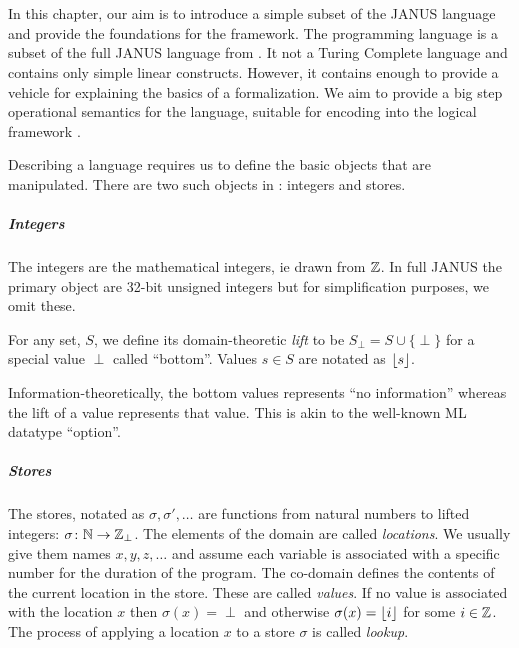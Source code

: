\chapter{\janusz{}}
\label{chap:janus0}

In this chapter, our aim is to introduce a simple subset of the JANUS
language and provide the foundations for the \coq{} framework. The
\janusz{} programming language is a subset of the full JANUS language
from \cite{yokoyama.gluck:reversible}. It not a Turing Complete language and
contains only simple linear constructs. However, it contains enough to
provide a vehicle for explaining the basics of a formalization. We aim
to provide a big step operational semantics for the language, suitable
for encoding into the logical framework \coq{}.

Describing a language requires us to define the basic objects that are
manipulated. There are two such objects in \janusz{}: integers and
stores.

\paragraph{Integers}

The integers are the mathematical integers, ie drawn from $\mathbb{Z}$. In
full JANUS the primary object are 32-bit unsigned integers but for
simplification purposes, we omit these.
\begin{defn}
  \label{defn-lift}
  For any set, $S$, we define its domain-theoretic \emph{lift} to be
  $S_{\perp} = S \cup \{\perp\} $ for a special value $\perp$ called
  ``bottom''. Values $s \in S$ are notated as $\lfloor s \rfloor$.
\end{defn}
Information-theoretically, the bottom values represents ``no
information'' whereas the lift of a value represents that value. This
is akin to the well-known ML datatype ``option''.

\paragraph{Stores}
\label{par:stores}
The stores, notated as $\sigma, \sigma', \dotsc$ are functions from
natural numbers to lifted integers: $\sigma \colon \mathbb{N} \to
\mathbb{Z}_{\perp}$. The elements of the domain are called
\emph{locations}. We usually give them names $x, y, z, \dotsc$ and
assume each variable is associated with a specific number for the
duration of the program. The co-domain defines the contents of the
current location in the store. These are called \emph{values}. If no
value is associated with the location $x$ then $\sigma(x) = \perp$ and
otherwise $\sigma(x) = \lfloor i \rfloor$ for some $i \in \mathbb{Z}$. The process of
applying a location $x$ to a store $\sigma$ is called \emph{lookup}.

